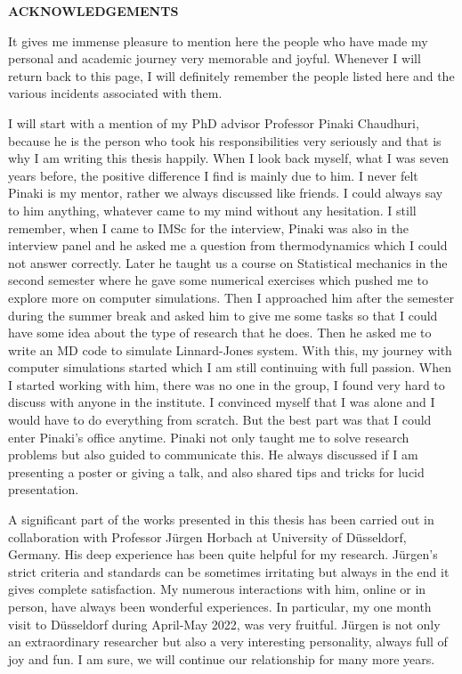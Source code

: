 \thispagestyle{plain}
\doublespacing
\vskip 1.0cm
%
\centerline{{\bf{\large ACKNOWLEDGEMENTS}}}
%
\vskip 0.5cm

It gives me immense pleasure to mention here the people who have made my personal and academic journey very memorable and joyful. Whenever I will return back to this page, I will definitely remember the people listed here and the various incidents associated with them.

I will start with a mention of my PhD advisor Professor Pinaki Chaudhuri, because he is the person who took his responsibilities very seriously and that is why I am writing this thesis happily. When I look back myself, what I was seven years before, the positive difference I find is mainly due to him. I never felt Pinaki is my mentor, rather we always discussed like friends. I could always say to him anything, whatever came to my mind without any hesitation. I still remember, when I came to IMSc for the interview, Pinaki was also in the interview panel and he asked me a question from thermodynamics which I could not answer correctly. Later he taught us a course on Statistical mechanics in the second semester where he gave some numerical exercises which pushed me to explore more on computer simulations. Then I approached him after the semester during the summer break and asked him to give me some tasks so that I could have some idea about the type of research that he does. Then he asked me to write an MD code to simulate Linnard-Jones system. With this, my journey with computer simulations started which I am still continuing with full passion. When I started working with him, there was no one in the group, I found very hard to discuss with anyone in the institute. I convinced myself that I was alone and I would have to do everything from scratch. But the best part was that I could enter Pinaki's office anytime. Pinaki not only taught me to solve research problems but also guided to communicate this. He always discussed if I am presenting a poster or giving a talk, and also shared tips and tricks for lucid presentation.

A significant part of the works presented in this thesis has been carried out in collaboration with Professor J\"urgen Horbach at University of D\"usseldorf, Germany. His deep experience has been quite helpful for my research. J\"urgen's strict criteria and standards can be sometimes irritating but always in the end it gives complete satisfaction. My numerous interactions with him, online or in person, have always been wonderful experiences. In particular, my one month visit to D\"usseldorf during April-May 2022, was very fruitful. J\"urgen is not only an extraordinary researcher but also a very interesting personality, always full of joy and fun. I am sure, we will continue our relationship for many more years.

